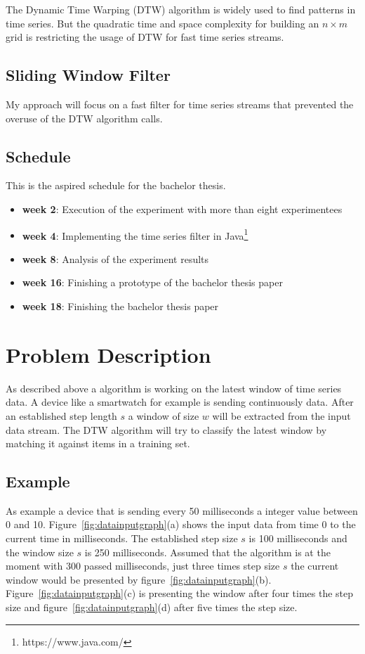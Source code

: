 \documentclass[runningheads,a4paper]{llncs}
\begin{document}
    The Dynamic Time Warping \cite{berndt1994using} (DTW) algorithm is widely used
    to find patterns in time series. But the quadratic time and space complexity for building an $n \times m$ grid is
    restricting the usage of DTW for fast time series streams.

    \subsection{Sliding Window Filter}
    My approach will focus on a fast filter for time series streams that prevented the overuse of the DTW algorithm
    calls.

    \subsection{Schedule}
    This is the aspired schedule for the bachelor thesis.
    \begin{itemize}
        \item \textbf{week 2}: Execution of the experiment with more than eight experimentees
        \item \textbf{week 4}: Implementing the time series filter in Java\footnote{https://www.java.com/}
        \item \textbf{week 8}: Analysis of the experiment results
        \item \textbf{week 16}: Finishing a prototype of the bachelor thesis paper
        \item \textbf{week 18}: Finishing the bachelor thesis paper
    \end{itemize}

    \section{Problem Description}
    As described above a algorithm is working on the latest window of time series data. A device like a smartwatch for
    example is sending continuously data. After an established step length $s$ a window of size $w$ will be extracted
    from the input data stream. The DTW algorithm will try to classify the latest window by matching it against items
    in a training set.

    \subsection{Example}
    As example a device that is sending every 50 milliseconds a integer value between 0 and 10.
    Figure~\ref{fig:datainputgraph}(a) shows the input data from time 0 to the current time in milliseconds. The
    established step size $s$ is 100 milliseconds and the window size $s$ is 250 milliseconds. Assumed that the
    algorithm is at the moment with 300 passed milliseconds, just three times step size $s$ the current window would be
    presented by figure~\ref{fig:datainputgraph}(b). Figure~\ref{fig:datainputgraph}(c) is presenting the window after
    four times the step size and figure~\ref{fig:datainputgraph}(d) after five times the step size.\\
\end{document}
